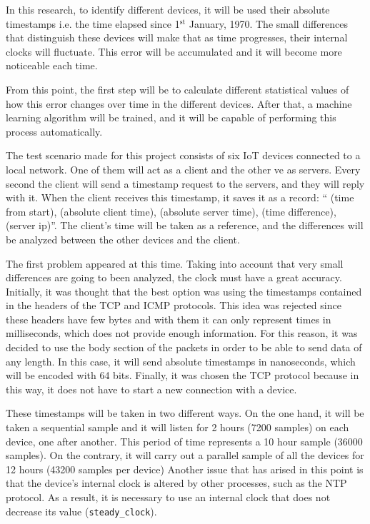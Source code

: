 In this research, to identify different devices, it will be used their absolute timestamps i.e. the time elapsed since 1$^\text{st}$ January, 1970. The small differences that distinguish these devices will make that as time progresses, their internal clocks will fluctuate. This error will be accumulated and it will become more noticeable each time.


From this point, the first step will be to calculate different statistical values of how this error changes over time in the different devices. After that, a machine learning algorithm will be trained, and it will be capable of performing this process automatically.


The test scenario made for this project consists of six IoT devices connected to a local network. One of them will act as a client and the other ve as servers. Every second the client will send a timestamp request to the servers, and they will reply with it. When the client receives this timestamp, it saves it as a record: “ (time from start), (absolute client time), (absolute server time), (time difference), (server ip)”. The client's time will be taken as a reference, and the differences will be analyzed between the other devices and the client.


The first problem appeared at this time. Taking into account that very small differences are going to been analyzed, the clock must have a great accuracy. Initially, it was thought that the best option was using the timestamps contained in the headers of the TCP and ICMP protocols. This idea was rejected since these headers have few bytes and with them it can only represent times in milliseconds, which does not provide enough information. For this reason, it was decided to use the body section of the packets in order to be able to send data of any length. In this case, it will send absolute timestamps in nanoseconds, which will be encoded with 64 bits. Finally, it was chosen the TCP protocol because in this way, it does not have to start a new connection with a device. 


These timestamps will be taken in two different ways. On the one hand, it will be taken a sequential sample and it will listen for 2 hours (7200 samples) on each device, one after another. This period of time represents a 10 hour sample (36000 samples). On the contrary, it will carry out a parallel sample of all the devices for 12 hours (43200 samples per device) Another issue that has arised in this point is that the device's internal clock is altered by other processes, such as the NTP protocol. As a result, it is necessary to use an internal clock that does not decrease its value (\texttt{steady\_clock}). 


